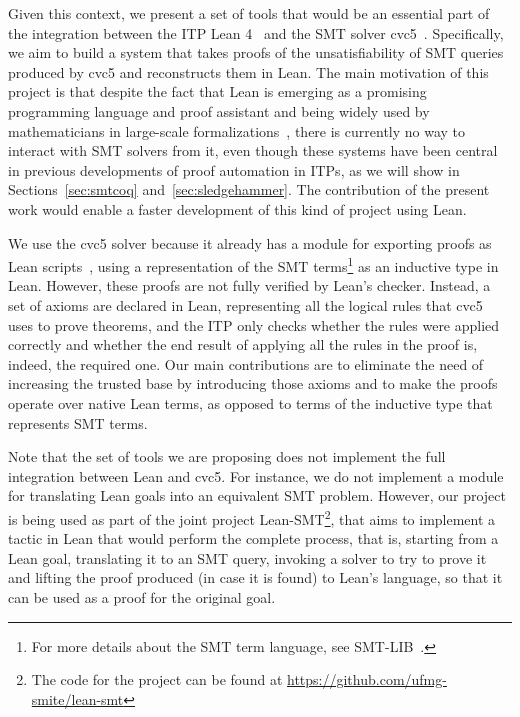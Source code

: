 Given this context, we present a set of tools that would be an essential
part of the integration between the ITP Lean 4~\cite{lean} and the SMT solver cvc5~\cite{cvc5}.
%
Specifically, we aim to build a system that takes proofs of the unsatisfiability of
SMT queries produced by cvc5 and reconstructs them in Lean.
%
The main motivation of this project is that despite the fact that Lean is
emerging as a promising programming language and proof assistant and being
widely used by mathematicians in large-scale
formalizations~\cite{mathlib, scholze}, there is currently no way to
interact with SMT solvers from it, even though these systems have been
central in previous developments of proof automation in ITPs, as we will show in Sections~\ref{sec:smtcoq}
and~\ref{sec:sledgehammer}. The contribution of the present work
would enable a faster development of this kind of project using Lean.

We use the cvc5 solver because it already has a module for exporting proofs as
Lean scripts~\cite{Barbosa2022}, using a representation of the SMT terms\footnote{For more details
about the SMT term language, see SMT-LIB~\cite{smtlib}.} as an inductive type in Lean.
However, these proofs are not fully verified by Lean's checker. Instead, a set of
axioms are declared in Lean, representing all the logical rules that cvc5 uses to prove
theorems, and the ITP only checks whether the rules were applied correctly and whether
the end result of applying all the rules in the proof is, indeed, the required one.
Our main contributions are to eliminate the need of increasing the trusted base by introducing
those axioms and to make the proofs operate over native Lean terms, as opposed to terms
of the inductive type that represents SMT terms.

Note that the set of tools we are proposing does not implement the full integration
between Lean and cvc5. For instance, we do not implement a module for translating
Lean goals into an equivalent SMT problem. However, our project is being used
as part of the joint project Lean-SMT\footnote{The code for the project can be found at \url{https://github.com/ufmg-smite/lean-smt}}, that aims to implement a tactic in Lean
that would perform the complete process, that is, starting from a Lean goal, translating it to an SMT query, invoking a solver to try to prove it and lifting the proof produced (in case it is found) to Lean's language, so that it can be used as a proof for the original goal.
